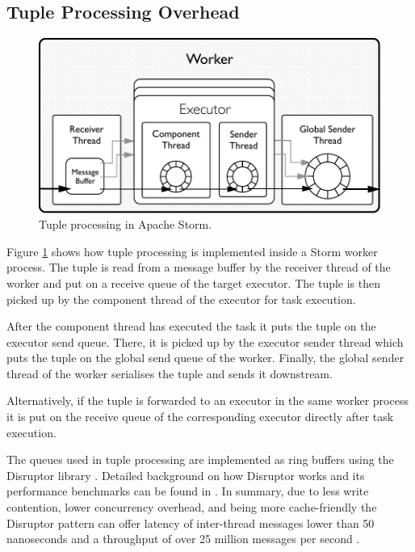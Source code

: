 \documentclass[bsc,logo,frontabs,twoside,singlespacing,normalheadings,parskip]{infthesis}\usepackage[]{graphicx}\usepackage[]{color}
\begin{document}
\subsection{Tuple Processing Overhead}

\begin{figure}[!htb]
	\centering
	\includegraphics[scale=0.7]{pdf/worker_inside.pdf}
	\caption{Tuple processing in Apache Storm.}
	\label{fig:worker_inside}
\end{figure}

Figure \ref{fig:worker_inside} shows how tuple processing is implemented inside a Storm worker process. The tuple is read from a message buffer by the receiver thread of the worker and put on a receive queue of the target executor. The tuple is then picked up by the component thread of the executor for task execution.

After the component thread has executed the task it puts the tuple on the executor send queue. There, it is picked up by the executor sender thread which puts the tuple on the global send queue of the worker. Finally, the global sender thread of the worker serialises the tuple and sends it downstream.

Alternatively, if the tuple is forwarded to an executor in the same worker process it is put on the receive queue of the corresponding executor directly after task execution.

The queues used in tuple processing are implemented as ring buffers using the Disruptor library \citep{LMAXDisruptor}. Detailed background on how Disruptor works and its performance benchmarks can be found in \citep{Thompson_Farley_Barker_Gee_Stewart_2011}. In summary, due to less write contention, lower concurrency overhead, and being more cache-friendly the Disruptor pattern can offer latency of inter-thread messages lower than 50 nanoseconds and a throughput of over 25 million messages per second \cite{Thompson_Farley_Barker_Gee_Stewart_2011}.
\end{document}
